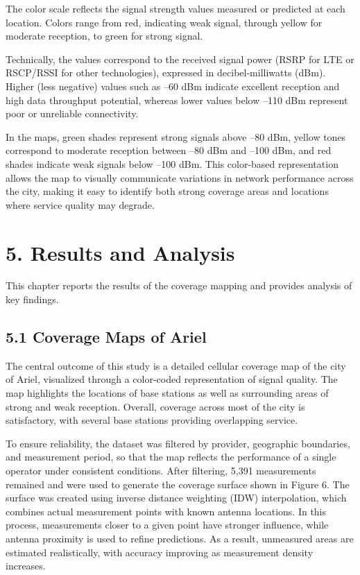 \documentclass[11pt]{article}
\begin{document}
The color scale reflects the signal strength values measured or predicted at each location. Colors range from red, indicating weak signal, through yellow for moderate reception, to green for strong signal.

Technically, the values correspond to the received signal power (RSRP for LTE or RSCP/RSSI for other technologies), expressed in decibel-milliwatts (dBm). Higher (less negative) values such as –60 dBm indicate excellent reception and high data throughput potential, whereas lower values below –110 dBm represent poor or unreliable connectivity. 

In the maps, green shades represent strong signals above –80 dBm, yellow tones correspond to moderate reception between –80 dBm and –100 dBm, and red shades indicate weak signals below –100 dBm.
This color-based representation allows the map to visually communicate variations in network performance across the city, making it easy to identify both strong coverage areas and locations where service quality may degrade.


\hypertarget{results-and-analysis}{%
\section{5. Results and Analysis}\label{results-and-analysis}}

This chapter reports the results of the coverage mapping and provides
analysis of key findings.

\hypertarget{coverage-maps-of-ariel}{%
\subsection{5.1 Coverage Maps of Ariel}\label{coverage-maps-of-ariel}}

The central outcome of this study is a detailed cellular coverage map of
the city of Ariel, visualized through a color-coded representation of
signal quality. The map highlights the locations of base stations as
well as surrounding areas of strong and weak reception. Overall,
coverage across most of the city is satisfactory, with several base
stations providing overlapping service.

To ensure reliability, the dataset was filtered by provider, geographic
boundaries, and measurement period, so that the map reflects the
performance of a single operator under consistent conditions. After
filtering, 5,391 measurements remained and were used to generate the
coverage surface shown in Figure 6. The surface was created using
inverse distance weighting (IDW) interpolation, which combines actual
measurement points with known antenna locations. In this process,
measurements closer to a given point have stronger influence, while
antenna proximity is used to refine predictions. As a result, unmeasured
areas are estimated realistically, with accuracy improving as
measurement density increases.
\end{document}
